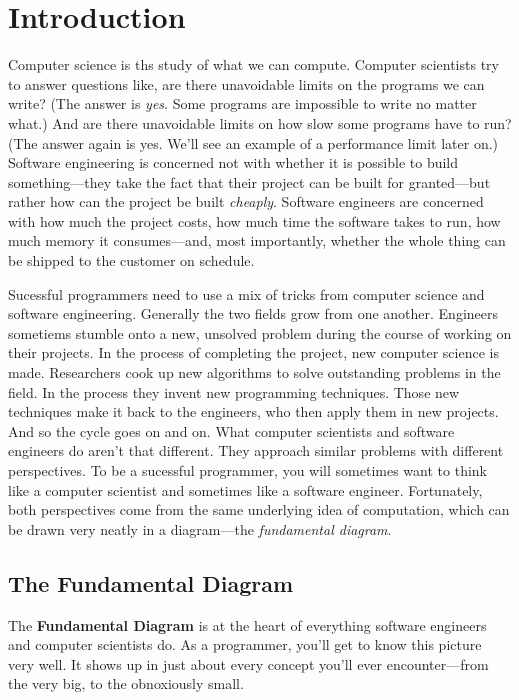 \setchapterpreamble[u]{\margintoc}
\chapter{Introduction}

Computer science is ths study of what we can compute. Computer scientists try to
answer questions like, are there unavoidable limits on the programs we can
write? (The answer is \emph{yes}. Some programs are impossible to write no
matter what.) And are there unavoidable limits on how slow some programs have to
run? (The answer again is yes. We'll see an example of a performance limit later
on.) Software engineering is concerned not with whether it is possible to build
something---they take the fact that their project can be built for granted---but
rather how can the project be built \emph{cheaply}. Software engineers are
concerned with how much the project costs, how much time the software takes to
run, how much memory it consumes---and, most importantly, whether the whole
thing can be shipped to the customer on schedule.

Sucessful programmers need to use a mix of tricks from computer science and
software engineering. Generally the two fields grow from one another. Engineers
sometiems stumble onto a new, unsolved problem during the course of working on
their projects. In the process of completing the project, new computer science
is made. Researchers cook up new algorithms to solve outstanding problems in the
field. In the process they invent new programming techniques. Those new
techniques make it back to the engineers, who then apply them in new projects.
And so the cycle goes on and on. What computer scientists and software engineers
do aren't that different. They approach similar problems with different
perspectives. To be a sucessful programmer, you will sometimes want to think
like a computer scientist and sometimes like a software engineer. Fortunately,
both perspectives come from the same underlying idea of computation, which can
be drawn very neatly in a diagram---the \emph{fundamental diagram}.

\section{The Fundamental Diagram}
The \textbf{Fundamental Diagram} is at the heart of everything software
engineers and computer scientists do. As a programmer, you'll get to know this
picture very well. It shows up in just about every concept you'll ever
encounter---from the very big, to the obnoxiously small.

